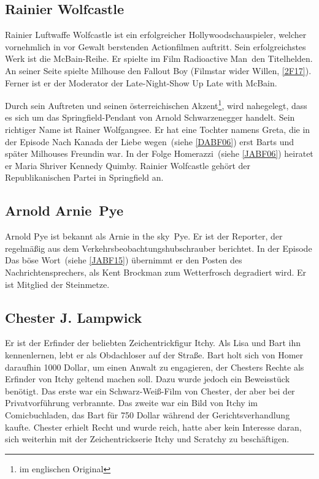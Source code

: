 \subsection{Rainier Wolfcastle}\label{RainierWolfcastle}
Rainier Luftwaffe Wolfcastle ist ein erfolgreicher Hollywoodschauspieler, welcher vornehmlich in vor Gewalt berstenden Actionfilmen auftritt. Sein erfolgreichstes Werk ist die McBain-Reihe. Er spielte im Film \glqq Radioactive Man\grqq\ den Titelhelden. An seiner Seite spielte Milhouse den Fallout Boy (\glqq Filmstar wider Willen\grqq , \ref{2F17}). Ferner ist er der Moderator der Late-Night-Show \glqq Up Late with McBain\grqq .

Durch sein Auftreten und seinen österreichischen Akzent\footnote{im englischen Original}, wird nahegelegt, dass es sich um das Springfield-Pendant von Arnold Schwarzenegger handelt. Sein richtiger Name ist Rainer Wolfgangsee. Er hat eine Tochter namens Greta, die in der Episode \glqq Nach Kanada der Liebe wegen\grqq\ (siehe \ref{DABF06}) erst Barts und später Milhouses Freundin war. In der Folge \glqq Homerazzi\grqq\ (siehe \ref{JABF06}) heiratet er Maria Shriver Kennedy Quimby. Rainier Wolfcastle gehört der Republikanischen Partei in Springfield an.


\subsection{Arnold \glqq Arnie\grqq\ Pye}\label{ArniePye}
Arnold Pye ist bekannt als Arnie \glqq in the sky\grqq\ Pye. Er ist der Reporter, der regelmäßig aus dem Verkehrsbeobachtungshubschrauber berichtet. In der Episode \glqq Das böse Wort\grqq\ (siehe \ref{JABF15}) übernimmt er den Posten des Nachrichtensprechers, als Kent Brockman zum Wetterfrosch degradiert wird. Er ist Mitglied der Steinmetze.


\subsection{Chester J. Lampwick}
Er ist der Erfinder der beliebten Zeichentrickfigur Itchy. Als Lisa und Bart ihn kennenlernen, lebt er als Obdachloser auf der Straße. Bart holt sich von Homer daraufhin 1000 Dollar, um einen Anwalt zu engagieren, der Chesters Rechte als Erfinder von Itchy geltend machen soll. Dazu wurde jedoch ein Beweisstück benötigt. Das erste war ein Schwarz-Weiß-Film von Chester, der aber bei der Privatvorführung verbrannte. Das zweite war ein Bild von Itchy im Comicbuchladen, das Bart für 750 Dollar während der Gerichtsverhandlung kaufte. Chester erhielt Recht und wurde reich, hatte aber kein Interesse daran, sich weiterhin mit der Zeichentrickserie Itchy und Scratchy zu beschäftigen.

